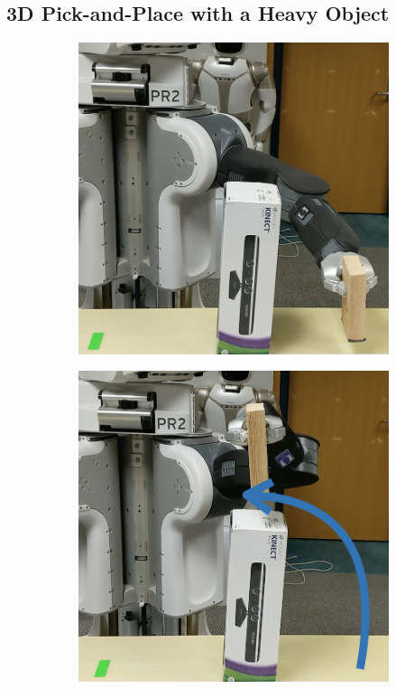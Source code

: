 \subsection{3D Pick-and-Place with a Heavy Object}
\label{sec:real-world-3d}

\begin{figure}[t]
  \centering
  \begin{subfigure}{0.13\linewidth}
    \includegraphics[width=\linewidth]{figures/cmax/pr2_pick_place_light_1_annotated.jpeg}
  \end{subfigure}
  \begin{subfigure}{0.13\linewidth}
    \includegraphics[width=\linewidth]{figures/cmax/pr2_pick_place_light_2_annotated.jpeg}

\end{subfigure}
\end{figure}
